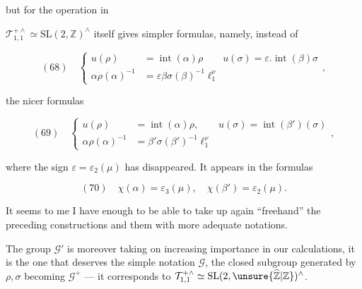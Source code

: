 


but for the operation in

$\mathcal T_{1,1}^{+\wedge}\simeq\mathrm{SL}(2,\mathbb Z)^{\wedge}$
itself gives simpler formulas, namely, instead of

\[
(68)\quad\left\{\begin{aligned}
u(\rho)&=\operatorname{int}(\alpha)\rho\qquad
u(\sigma)=\varepsilon.\operatorname{int}(\beta)\sigma\\
\alpha\rho(\alpha)^{-1}&=\varepsilon\beta\sigma(\beta)^{-1}\ell_1^\nu
\end{aligned}\right.,
\]

the nicer formulas

\[
(69)\quad\left\{\begin{aligned}
u(\rho)&=\operatorname{int}(\alpha)\rho,\qquad
u(\sigma)=\operatorname{int}(\beta')(\sigma)\\
\alpha\rho(\alpha)^{-1}&=\beta'\sigma(\beta')^{-1}\ell_1^\nu
\end{aligned}\right.,
\]

where the sign $\varepsilon=\varepsilon_2(\mu)$ has disappeared. It appears in the formulas

\[
(70)\quad\chi(\alpha)=\varepsilon_3(\mu),\quad
\chi(\beta')=\varepsilon_2(\mu).
\]

It seems to me I have enough to be able to take up again ``freehand'' the
preceding constructions and  them with more adequate notations.

The group $\mathcal G'$
is moreover taking on increasing importance in our calculations, it is the one that deserves
 the simple notation $\mathcal G$, the closed subgroup
generated by $\rho,\sigma$ becoming $\mathcal G^{+}$ --- it corresponds to
$\mathcal T_{1,1}^{+\wedge}\simeq\mathrm{SL}(2,\unsure{\widehat{\mathbb Z}|\mathbb Z})^{\wedge}$.

